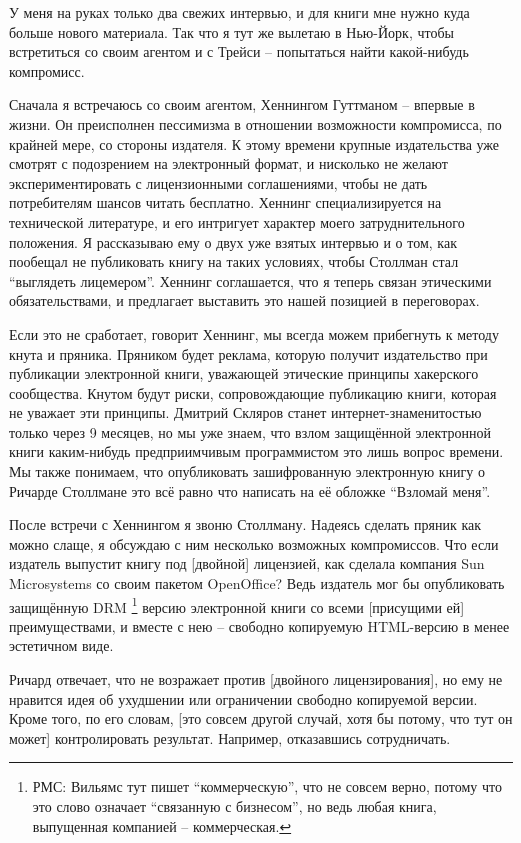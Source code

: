 У меня на руках только два свежих интервью, и для книги мне нужно куда больше нового материала. Так что я тут же вылетаю в Нью-Йорк, чтобы встретиться со своим агентом и с Трейси -- попытаться найти какой-нибудь компромисс.

Сначала я встречаюсь со своим агентом, Хеннингом Гуттманом -- впервые в жизни. Он преисполнен пессимизма в отношении возможности компромисса, по крайней мере, со стороны издателя. К этому времени крупные издательства уже смотрят с подозрением на электронный формат, и нисколько не желают экспериментировать с лицензионными соглашениями, чтобы не дать потребителям шансов читать бесплатно. Хеннинг специализируется на технической литературе, и его интригует характер моего затруднительного положения. Я рассказываю ему о двух уже взятых интервью и о том, как пообещал не публиковать книгу на таких условиях, чтобы Столлман стал \enquote{выглядеть лицемером}. Хеннинг соглашается, что я теперь связан этическими обязательствами, и предлагает выставить это нашей позицией в переговорах.

Если это не сработает, говорит Хеннинг, мы всегда можем прибегнуть к методу кнута и пряника. Пряником будет реклама, которую получит издательство при публикации электронной книги, уважающей этические принципы хакерского сообщества. Кнутом будут риски, сопровождающие публикацию книги, которая не уважает эти принципы. Дмитрий Скляров станет интернет-знаменитостью только через 9 месяцев, но мы уже знаем, что взлом защищённой электронной книги каким-нибудь предприимчивым программистом это лишь вопрос времени. Мы также понимаем, что опубликовать зашифрованную электронную книгу о Ричарде Столлмане это всё равно что написать на её обложке \enquote{Взломай меня}.

После встречи с Хеннингом я звоню Столлману. Надеясь сделать пряник как можно слаще, я обсуждаю с ним несколько возможных компромиссов. Что если издатель выпустит книгу под [двойной] лицензией, как сделала компания Sun Microsystems со своим пакетом OpenOffice? Ведь издатель мог бы опубликовать защищённую DRM \footnote{РМС: Вильямс тут пишет \enquote{коммерческую}, что не совсем верно, потому что это слово означает \enquote{связанную с бизнесом}, но ведь любая книга, выпущенная компанией -- коммерческая.} версию электронной книги со всеми [присущими ей] преимуществами, и вместе с нею -- свободно копируемую HTML-версию в менее эстетичном виде.

Ричард отвечает, что не возражает против [двойного лицензирования], но ему не нравится идея об ухудшении или ограничении свободно копируемой версии. Кроме того, по его словам, [это совсем другой случай, хотя бы потому, что тут он может] контролировать результат. Например, отказавшись сотрудничать.

